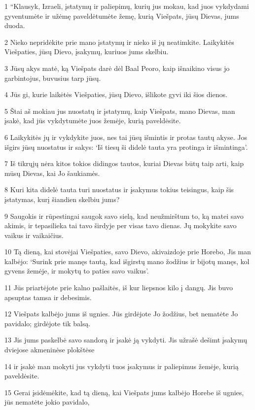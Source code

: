 \par 1 “Klausyk, Izraeli, įstatymų ir paliepimų, kurių jus mokau, kad juos vykdydami gyventumėte ir užėmę paveldėtumėte žemę, kurią Viešpats, jūsų Dievas, jums duoda. 
\par 2 Nieko nepridėkite prie mano įstatymų ir nieko iš jų neatimkite. Laikykitės Viešpaties, jūsų Dievo, įsakymų, kuriuos jums skelbiu. 
\par 3 Jūsų akys matė, ką Viešpats darė dėl Baal Peoro, kaip išnaikino visus jo garbintojus, buvusius tarp jūsų. 
\par 4 Jūs gi, kurie laikėtės Viešpaties, jūsų Dievo, išlikote gyvi iki šios dienos. 
\par 5 Štai aš mokiau jus nuostatų ir įstatymų, kaip Viešpats, mano Dievas, man įsakė, kad jūs vykdytumėte juos žemėje, kurią paveldėsite. 
\par 6 Laikykitės jų ir vykdykite juos, nes tai jūsų išmintis ir protas tautų akyse. Jos išgirs jūsų nuostatus ir sakys: ‘Iš tiesų ši didelė tauta yra protinga ir išmintinga’. 
\par 7 Iš tikrųjų nėra kitos tokios didingos tautos, kuriai Dievas būtų taip arti, kaip mūsų Dievas, kai Jo šaukiamės. 
\par 8 Kuri kita didelė tauta turi nuostatus ir įsakymus tokius teisingus, kaip šis įstatymas, kurį šiandien skelbiu jums? 
\par 9 Saugokis ir rūpestingai saugok savo sielą, kad neužmirštum to, ką matei savo akimis, ir tepasilieka tai tavo širdyje per visas tavo dienas. Jų mokykite savo vaikus ir vaikaičius. 
\par 10 Tą dieną, kai stovėjai Viešpaties, savo Dievo, akivaizdoje prie Horebo, Jis man kalbėjo: ‘Surink prie manęs tautą, kad išgirstų mano žodžius ir bijotų manęs, kol gyvens žemėje, ir mokytų to paties savo vaikus’. 
\par 11 Jūs priartėjote prie kalno pašlaitės, iš kur liepsnos kilo į dangų. Jis buvo apsuptas tamsa ir debesimis. 
\par 12 Viešpats kalbėjo jums iš ugnies. Jūs girdėjote Jo žodžius, bet nematėte Jo pavidalo; girdėjote tik balsą. 
\par 13 Jis jums paskelbė savo sandorą ir įsakė ją vykdyti. Jis užrašė dešimt įsakymų dviejose akmeninėse plokštėse 
\par 14 ir įsakė man mokyti jus vykdyti tuos įsakymus ir paliepimus žemėje, kurią paveldėsite. 
\par 15 Gerai įsidėmėkite, kad tą dieną, kai Viešpats jums kalbėjo Horebe iš ugnies, jūs nematėte jokio pavidalo, 
